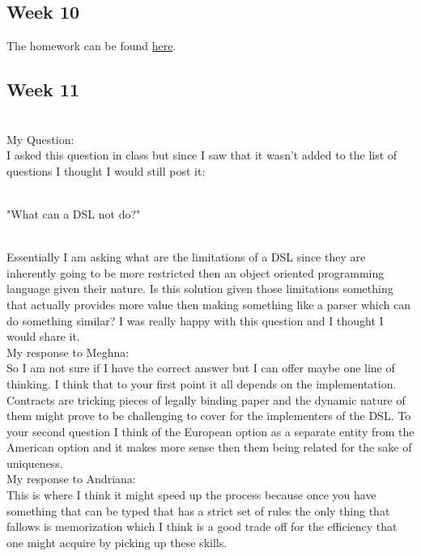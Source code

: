 \documentclass{article}
\theoremstyle{theorem}
\theoremstyle{definition}
\theoremstyle{remark}
\begin{document}
\subsection{Week 10}
The homework can be found \href{https://github.com/jacgoldberg/Programming-Lang/blob/main/homework10.txt}{here}.

\subsection{Week 11}
\\My Question:
\\I asked this question in class but since I saw that it wasn't added to the list of questions I thought I would still post it:

\\"What can a DSL not do?"

\\Essentially I am asking what are the limitations of a DSL since they are inherently going to be more restricted then an object oriented programming language given their nature. Is this solution given those limitations something that actually provides more value then making something like a parser which can do something similar? I was really happy with this question and I thought I would share it.
\\My response to Meghna:
\\So I am not sure if I have the correct answer but I can offer maybe one line of thinking. I think that to your first point it all depends on the implementation. Contracts are tricking pieces of legally binding paper and the dynamic nature of them might prove to be challenging to cover for the implementers of the DSL. To your second question I think of the European option as a separate entity from the American option and it makes more sense then them being related for the sake of uniqueness. 
\\My response to Andriana:
\\This is where I think it might speed up the process because once you have something that can be typed that has a strict set of rules the only thing that fallows is memorization which I think is a good trade off for the efficiency that one might acquire by picking up these skills.
\end{document}
